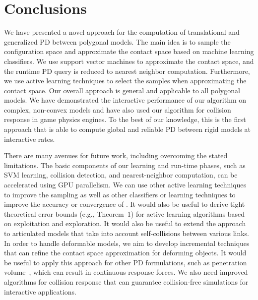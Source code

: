 \section{Conclusions}
We have presented a novel approach for the computation of translational and generalized PD between polygonal models.
The main idea is to sample the configuration space and approximate the contact space based on
machine learning classifiers. We use support vector machines to approximate the contact space, and
the runtime PD query is reduced to nearest neighbor computation. Furthermore,
we use active learning techniques to select the samples when approximating the contact space.
Our overall approach is general and applicable to all polygonal models.
We have demonstrated the interactive performance of our algorithm on complex, non-convex models and have also used
our algorithm for collision response in game physics engines.
To the best of our knowledge, this is the first approach that is able to compute global and reliable PD between rigid models at
interactive rates.


There are many avenues for future work, including overcoming the stated limitations. The basic components of our learning and run-time phases, such as SVM learning, collision detection, and nearest-neighbor computation, can be accelerated using GPU parallelism. We can use other active learning techniques to improve the sampling as well as other classifiers or learning techniques to improve the accuracy or convergence of \LCS. It would also be useful to derive tight theoretical error bounds (e.g., Theorem~1) for active learning algorithms based on exploitation and exploration.
It would also be useful to extend the approach to articulated models that take into account self-collisions between various links.
In order to handle deformable models, we aim to develop incremental techniques that can refine the contact
space approximation for deforming objects. It would be useful to apply this approach for other PD formulations, such as penetration volume~\cite{Weller-RSS-09}, which can result in continuous response forces. We also need improved algorithms for collision response that can guarantee collision-free simulations for interactive applications.

